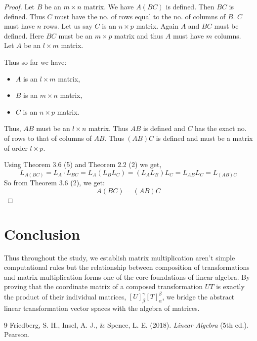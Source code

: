 \documentclass[12pt, a4paper]{article}
\theoremstyle{definition}
\theoremstyle{remark}
\begin{document}
\begin{proof}
    Let $B$ be an $m \times n$ matrix. We have $A(BC)$ is defined. Then $BC$ is defined. Thus $C$ must have the no. of rows equal to the no. of columns of $B$. $C$ must have $n$ rows. Let us say $C$ is an $n \times p$ matrix. Again $A$ and $BC$ must be defined. Here $BC$ must be an $m \times p$ matrix and thus $A$ must have $m$ columns. Let $A$ be an $l \times m$ matrix. 

    Thus so far we have:
    \begin{itemize}
        \item $A$ is an $l \times m$ matrix,
        \item $B$ is an $m \times n$ matrix,
        \item $C$ is an $n \times p$ matrix.
    \end{itemize}

    Thus, $AB$ must be an $l \times n$ matrix. Thus $AB$ is defined and $C$ has the exact no. of rows to that of columns of $AB$. Thus $(AB)C$ is defined and must be a matrix of order $l \times p$.

    Using Theorem 3.6 (5) and Theorem 2.2 (2) we get,
    \[ L_{A(BC)} = L_A \cdot L_{BC} = L_A(L_B L_C) = (L_A L_B)L_C = L_{AB} L_C = L_{(AB)C} \]
    So from Theorem 3.6 (2), we get:
    \[ A(BC) = (AB)C \]
\end{proof}

\section{Conclusion}
Thus throughout the study, we establish matrix multiplication aren't simple computational rules but the relationship between composition of transformations and matrix multiplication forms one of the core foundations of linear algebra. By proving that the coordinate matrix of a composed transformation $UT$ is exactly the product of their individual matrices, $[U]_\beta^\gamma [T]_\alpha^\beta$, we bridge the abstract linear transformation vector spaces with the algebra of matrices.

\begin{thebibliography}{9}
    Friedberg, S. H., Insel, A. J., \& Spence, L. E. (2018). \textit{Linear Algebra} (5th ed.). Pearson.
\end{thebibliography}
\end{document}
